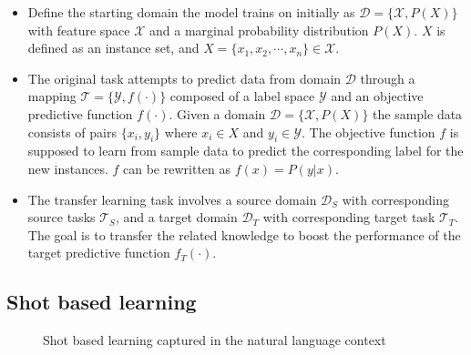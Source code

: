 \documentclass[12pt,twoside]{report}
\begin{document}
\begin{itemize}
  \item Define the starting domain the model trains on initially as $\mathcal{D} = \{\mathcal{X}, P(X)\}$ with feature space $\mathcal{X}$ and a marginal probability distribution $P(X)$. $X$ is defined as an instance set, and $X = \{x_1, x_2, \cdots, x_n\} \in \mathcal{X}$.
  
  \item The original task attempts to predict data from domain $\mathcal{D}$ through a mapping $\mathcal{T} = \{\mathcal{Y}, f(\cdot)\}$ composed of a label space $\mathcal{Y}$ and an objective predictive function $f(\cdot)$. Given a domain $\mathcal{D} = \{\mathcal{X}, P(X)\}$ the sample data consists of pairs $\{x_i, y_i\}$ where $x_i \in X$ and $y_i \in \mathcal{Y}$. The objective function $f$ is supposed to learn from sample data to predict the corresponding label for the new instances. $f$ can be rewritten as $f(x)=P(y|x)$.
  
  \item The transfer learning task involves a source domain $\mathcal{D}_S$ with corresponding source tasks $\mathcal{T}_S$, and a target domain $\mathcal{D}_T$ with corresponding target task $\mathcal{T}_T$. The goal is to transfer the related knowledge to boost the performance of the target predictive function $f_T(\cdot)$.
\end{itemize}

\subsection{Shot based learning}

\begin{figure}[H]
  \centering
  \caption{Shot based learning captured in the natural language context~\cite{openaishotbasedlearning}}
\end{figure}
\end{document}
